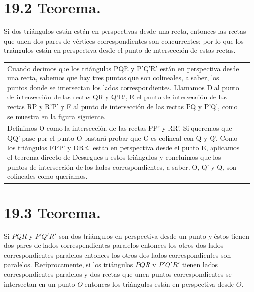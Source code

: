 \documentclass[12pt,a4paper, oneside]{book}
\begin{document}
\section{19.2 Teorema.}
Si dos triángulos están están en perspectivas desde una recta, entonces las rectas que unen dos pares de vértices correspondientes son concurrentes; por lo que los triángulos están en perspectiva desde el punto de intersección de estas rectas.
\\
\begin{tabular}{p{15.9 cm} p{1cm}}
Cuando decimos que los triángulos PQR y P'Q'R' están en perspectiva desde una recta, sabemos que hay tres puntos que son colineales, a saber, los puntos donde se intersectan los lados correspondientes. Llamamos D al punto de intersección de las rectas QR y Q'R', E el punto de intersección de las rectas RP y R'P' y F al punto de intersección de las rectas PQ y P'Q', como se muestra en la figura siguiente.
\\Definimos O como la intersección de las rectas PP' y RR'. Si queremos que QQ' pase por el punto O bastará probar que O es colineal con Q y Q'. Como los triángulos FPP' y DRR' están en perspectiva desde el punto E, aplicamos el teorema directo de Desargues a estos triángulos y concluimos que los puntos de intersección de los lados correspondientes, a saber, O, Q' y Q, son colineales como queríamos.
\end{tabular}
\section{19.3 Teorema.}
Si $PQR$ y $P'Q'R'$ son dos triángulos  en perspectiva desde un punto y éstos tienen dos pares de lados correspondientes paralelos entonces los otros dos lados correspondientes paralelos entonces los otros dos lados correspondientes son paralelos. Recíprocamente, si los triángulos $PQR$ y $P'Q'R'$ tienen lados correspondientes paralelos y dos rectas que unen puntos correspondientes se intersectan en un punto $O$ entonces los triángulos están en perspectiva desde $O$.
\end{document}

